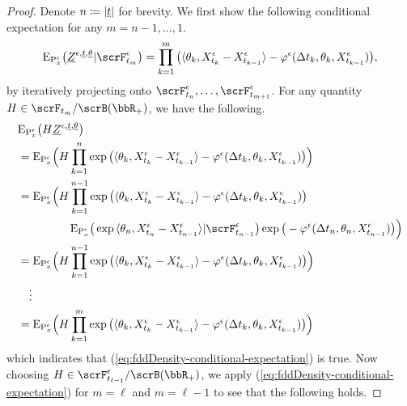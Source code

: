 \begin{proof}
  \label{proof:proposition:twists}
  Denote $n \coloneqq |\underline t|$ for brevity.
  We first show the following conditional expectation for any $m = n-1,\ldots, 1$.
  \begin{equation}
    \label{eq:fddDensity-conditional-expectation}
    \Exp_{\Prb^\epsilon_\stateVar}\big(\fddDensity^{\epsilon,\underline t, \underline\twistVar} | \scrF^\epsilon_{t_m} \big) = \prod_{k=1}^m \big( \prj{\twistVar_k}{\Xee_{t_k}-\Xee_{t_{k-1}}} - \affShift^\epsilon(\Delta t_k, \twistVar_k, \Xee_{t_{k-1}})\big),
  \end{equation}
  by iteratively projecting onto $\scrF^\epsilon_{t_n}, \ldots, \scrF^\epsilon_{t_{m+1}}$.
  For any quantity $H \in \scrF_{t_m}/\scrB(\bbR_+)$, we have the following.
  \begin{align*}
    &\Exp_{\Prb^\epsilon_\stateVar}\big(H \fddDensity^{\epsilon,\underline t, \underline\twistVar} \big) \\
    &= \Exp_{\Prb^\epsilon_\stateVar}\Big( H \prod_{k=1}^n \exp\big(  \prj{\twistVar_k}{\Xee_{t_k}-\Xee_{t_{k-1}}} - \affShift^\epsilon(\Delta t_k, \twistVar_k, \Xee_{t_{k-1}})\big) \Big)  \\
    &= \Exp_{\Prb^\epsilon_\stateVar}\Big( \begin{aligned}[t]
      &H \prod_{k=1}^{n-1} \exp\big(  \prj{\twistVar_k}{\Xee_{t_k}-\Xee_{t_{k-1}}} - \affShift^\epsilon(\Delta t_k, \twistVar_k, \Xee_{t_{k-1}})\big)  \\
      &\quad\Exp_{\Prb^\epsilon_\stateVar}\big( \exp\prj{\twistVar_n}{\Xee_{t_n}-\Xee_{t_{n-1}}} | \scrF^\epsilon_{t_{n-1}}\big)\exp\big(-\affShift^\epsilon(\Delta t_n, \twistVar_n, \Xee_{t_{n-1}})\big) \Big)  
    \end{aligned}\\
    &= \Exp_{\Prb^\epsilon_\stateVar}\Big( H \prod_{k=1}^{n-1} \exp\big(  \prj{\twistVar_k}{\Xee_{t_k}-\Xee_{t_{k-1}}} - \affShift^\epsilon(\Delta t_k, \twistVar_k, \Xee_{t_{k-1}})\big) \Big) \\
    &\quad\vdots \\
    &= \Exp_{\Prb^\epsilon_\stateVar}\Big( H \prod_{k=1}^m \exp\big(  \prj{\twistVar_k}{\Xee_{t_k}-\Xee_{t_{k-1}}} - \affShift^\epsilon(\Delta t_k, \twistVar_k, \Xee_{t_{k-1}})\big) \Big)
  \end{align*}
  which indicates that (\ref{eq:fddDensity-conditional-expectation}) is true.
  Now choosing $H \in \scrF^\epsilon_{t_{\ell-1}}/\scrB(\bbR_+)$, we apply (\ref{eq:fddDensity-conditional-expectation}) for $m=\ell$ and $m=\ell-1$ to see that the following holds.

\end{proof}
